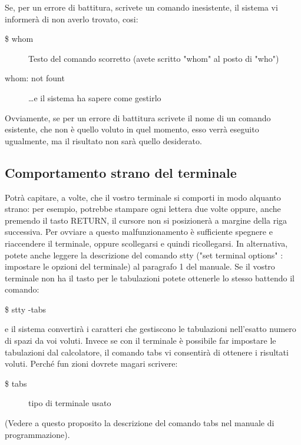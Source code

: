Se, per un errore di battitura, scrivete un comando inesistente, il sistema vi informerà
di non averlo trovato, cosi:
\begin{description}
	\item[\$ whom ]  Testo del comando scorretto (avete scritto
	"whom" al posto di "who")
	\item[whom: not fount] \dots e il sistema ha sapere come gestirlo 
\end{description}
Ovviamente, se per un errore di battitura scrivete il nome di un comando esistente,
che non è quello voluto in quel momento, esso verrà eseguito ugualmente, ma il risultato
non sarà quello desiderato.
\subsection{Comportamento strano del terminale}
Potrà capitare, a volte, che il vostro terminale si comporti in modo alquanto strano:
per esempio, potrebbe stampare ogni lettera due volte oppure, anche premendo il tasto
RETURN, il cursore non si posizionerà a margine della riga successiva. Per ovviare
a questo malfunzionamento è sufficiente spegnere e riaccendere il terminale,
oppure scollegarsi e quindi ricollegarsi. In alternativa, potete anche leggere la descrizione
del comando stty ("set terminal options" : impostare le opzioni del terminale)
al paragrafo 1 del manuale. Se il vostro terminale non ha il tasto per le tabulazioni
potete ottenerle lo stesso battendo il comando:
\begin{description}
	\item[\$ stty -tabs ] 
\end{description}
e il sistema convertirà i caratteri che gestiscono le tabulazioni nell'esatto numero di
spazi da voi voluti. Invece se con il terminale è possibile far impostare le tabulazioni
dal calcolatore, il comando tabs vi consentirà di ottenere i risultati voluti. Perché fun
zioni dovrete magari scrivere:
\begin{description}
	\item[\$ tabs ] tipo di terminale usato 
\end{description}
(Vedere a questo proposito la descrizione del comando tabs nel manuale di programmazione).
